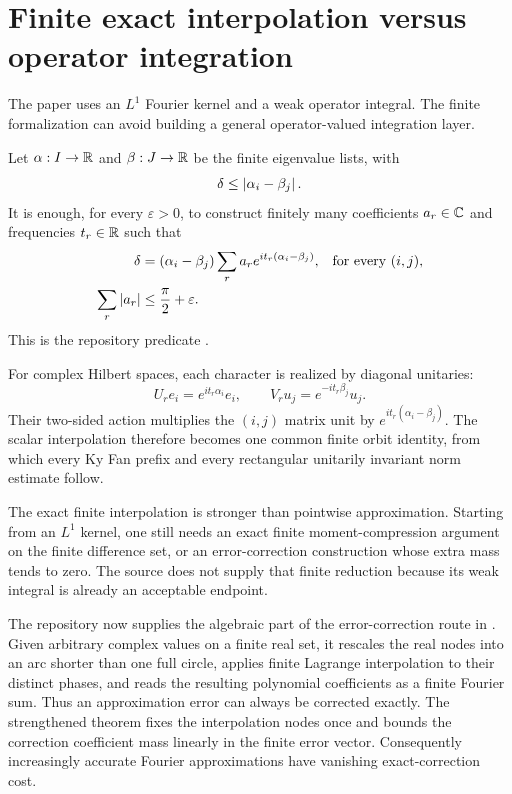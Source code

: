 \section{Finite exact interpolation versus operator integration}

The paper uses an $L^1$ Fourier kernel and a weak operator integral. The finite formalization can avoid building a general operator-valued integration layer.

Let $\alpha:I\to\mathbb{R}$ and $\beta:J\to\mathbb{R}$ be the finite eigenvalue lists, with
\[
  \delta\le\left\lvert \alpha_i-\beta_j\right\rvert.
\]
It is enough, for every $\varepsilon>0$, to construct finitely many coefficients $a_r\in\mathbb{C}$ and frequencies $t_r\in\mathbb{R}$ such that
\begin{align*}
  \delta
  &= (\alpha_i-\beta_j)
     \sum_r a_r e^{it_r(\alpha_i-\beta_j)},
     &&\text{for every }(i,j),\\
  \sum_r\left\lvert a_r\right\rvert
  &\le \frac\pi2+\varepsilon.
\end{align*}
This is the repository predicate
.

For complex Hilbert spaces, each character is realized by diagonal unitaries:
\[
  U_r e_i=e^{it_r\alpha_i}e_i,
  \qquad
  V_r u_j=e^{-it_r\beta_j}u_j.
\]
Their two-sided action multiplies the $(i,j)$ matrix unit by
$e^{it_r(\alpha_i-\beta_j)}$. The scalar interpolation therefore becomes one common finite orbit identity, from which every Ky Fan prefix and every rectangular unitarily invariant norm estimate follow.

The exact finite interpolation is stronger than pointwise approximation. Starting from an $L^1$ kernel, one still needs an exact finite moment-compression argument on the finite difference set, or an error-correction construction whose extra mass tends to zero. The source does not supply that finite reduction because its weak integral is already an acceptable endpoint.

The repository now supplies the algebraic part of the error-correction route in
. Given arbitrary complex values
on a finite real set, it rescales the real nodes into an arc shorter than one
full circle, applies finite Lagrange interpolation to their distinct phases,
and reads the resulting polynomial coefficients as a finite Fourier sum. Thus
an approximation error can always be corrected exactly. The strengthened
theorem 
fixes the interpolation nodes once and bounds the correction coefficient mass
linearly in the finite error vector. Consequently increasingly accurate
Fourier approximations have vanishing exact-correction cost.

